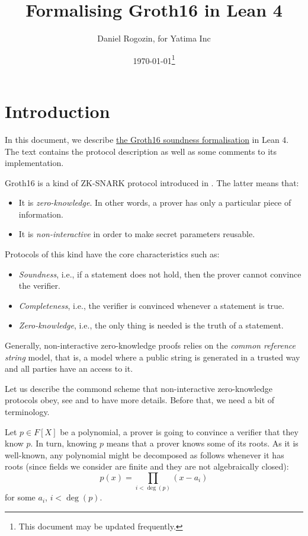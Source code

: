 \documentclass{article}
\title{Formalising Groth16 in Lean 4}
\author{Daniel Rogozin, for Yatima Inc}
\date{\today\footnote{This document may be updated frequently.}}
\theoremstyle{definition}
\theoremstyle{remark}
\begin{document}
\maketitle

\section{Introduction}

In this document, we describe \href{https://github.com/yatima-inc/ZKSnark.lean/blob/daniel/groth16-protocol/ZkSNARK/Groth16/KnowledgeSoundness.lean}{the Groth16 soundness formalisation} in Lean 4.
The text contains the protocol description as well as some comments to its implementation.

Groth16 is a kind of ZK-SNARK protocol introduced in \cite{groth2016size}. The latter means that:

\begin{itemize}
\item It is \emph{zero-knowledge}. In other words, a prover has only a particular piece of information.
\item It is \emph{non-interactive} in order to make secret parameters reusable.
\end{itemize}

Protocols of this kind have the core characteristics such as:
\begin{itemize}
\item \emph{Soundness}, i.e., if a statement does not hold, then the prover cannot convince the verifier.
\item \emph{Completeness}, i.e., the verifier is convinced whenever a statement is true.
\item \emph{Zero-knowledge}, i.e., the only thing is needed is the truth of a statement.
\end{itemize}

Generally, non-interactive zero-knowledge proofs relies on the \emph{common reference string} model, that is, a model where a public string is generated in a trusted way and all parties have an access to it.

Let us describe the commond scheme that non-interactive zero-knowledge protocols obey, see \cite{petkus2019and} and \cite{bitansky2012extractable} to have more details. Before that, we need a bit of terminology.

Let $p \in F[X]$ be a polynomial, a prover is going to convince a verifier that they know $p$. In turn, knowing $p$ means that a prover knows some of its roots. As it is well-known, any polynomial might be decomposed as follows whenever it has roots (since fields we consider are finite and they are not algebraically closed):
\begin{equation}
p(x) = \prod_{i < \deg(p)} (x - a_i)
\end{equation}
for some $a_i$, $i < \deg(p)$.
\end{document}
